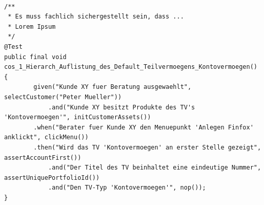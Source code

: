 \begin{lstlisting}[caption={Beispielhaftes Codestück eines \Gls{BDD} Tests},label=lst:bddcode]

/**
 * Es muss fachlich sichergestellt sein, dass ...
 * Lorem Ipsum
 */
@Test
public final void cos_1_Hierarch_Auflistung_des_Default_Teilvermoegens_Kontovermoegen() {
		given("Kunde XY fuer Beratung ausgewaehlt", selectCustomer("Peter Mueller"))
			.and("Kunde XY besitzt Produkte des TV's 'Kontovermoegen'", initCustomerAssets())
		.when("Berater fuer Kunde XY den Menuepunkt 'Anlegen Finfox' anklickt", clickMenu())
		.then("Wird das TV 'Kontovermoegen' an erster Stelle gezeigt", assertAccountFirst())
			.and("Der Titel des TV beinhaltet eine eindeutige Nummer", assertUniquePortfolioId())
			.and("Den TV-Typ 'Kontovermoegen'", nop());
}
\end{lstlisting}

